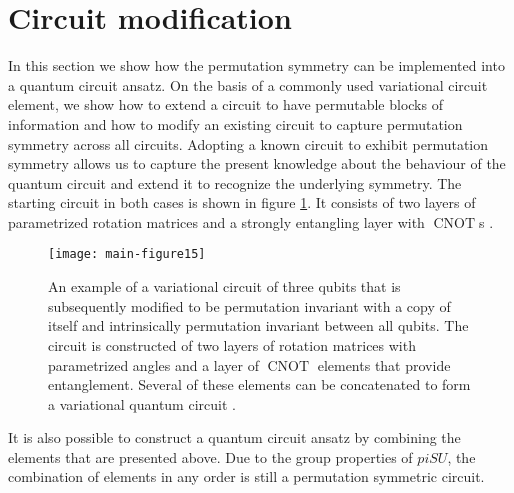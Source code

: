 \documentclass[%
 reprint,
 amsmath,amssymb,
 aps,
]{revtex4-2}
\newcommand{\CNOT}{\operatorname{CNOT}}
\theoremstyle{definition}%
\begin{document}

\section{Circuit modification}\label{sec:applications}

In this section we show how the permutation symmetry can be implemented into a quantum circuit ansatz. On the basis of a commonly used variational circuit element, we show how to extend a circuit to have permutable blocks of information and how to modify an existing circuit to capture permutation symmetry across all circuits. Adopting a known circuit to exhibit permutation symmetry allows us to capture the present knowledge about the behaviour of the quantum circuit and extend it to recognize the underlying symmetry. The starting circuit in both cases is shown in figure \ref{fig:var-circuit-base}. It consists of two layers of parametrized rotation matrices and a strongly entangling layer with $\CNOT$s \cite{schuld_introduction_2015}.

\begin{figure}
\centering
\texttt{[image: main-figure15]}

    \caption{An example of a variational circuit of three qubits that is subsequently modified to be permutation invariant with a copy of itself and intrinsically permutation invariant between all qubits. The circuit is constructed of two layers of rotation matrices with parametrized angles and a layer of $\CNOT$ elements that provide entanglement. Several of these elements can be concatenated to form a variational quantum circuit \cite{schuld_introduction_2015}.}
    \label{fig:var-circuit-base}
\end{figure}

It is also possible to construct a quantum circuit ansatz by combining the elements that are presented above. Due to the group properties of $piSU$, the combination of elements in any order is still a permutation symmetric circuit.

\end{document}
